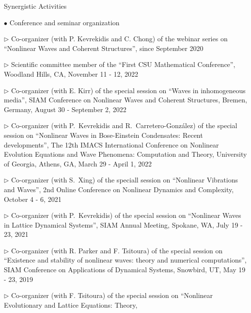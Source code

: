 \documentclass[10pt]{article} %
\newenvironment{outerlist}[1][\enskip\textbullet]%
        {\begin{itemize}[#1]}{\end{itemize}%
         \vspace{-.6\baselineskip}}
\newenvironment{innerlist}[1][\enskip\textbullet]%
        {\begin{compactitem}[#1]}{\end{compactitem}}
\begin{document}
\begin{section}{Synergistic Activities}
\begin{outerlist}
\item[$\bullet$]  \vskip -7mm Conference and seminar organization 
\begin{innerlist} 
\item[$\triangleright$] Co-organizer (with P. Kevrekidis and C. Chong) of the webinar series on 
                        ``Nonlinear Waves and Coherent Structures'', since September 2020
\item[$\triangleright$] Scientific committee member of the ``First CSU Mathematical Conference'', Woodland Hills, CA, November 11 - 12, 2022
\item[$\triangleright$] Co-organizer (with E. Kirr) of the special session on ``Waves in inhomogeneous media'', 
                        SIAM Conference on Nonlinear Waves and Coherent Structures, Bremen, Germany, August 30 - September 2, 2022                        
\item[$\triangleright$] Co-organizer (with P.~Kevrekidis and R.~Carretero-Gonz{\'a}lez) of 
                        the special session on ``Nonlinear Waves in Bose-Einstein Condensates: Recent developments'', 
                        The 12th IMACS International Conference on Nonlinear Evolution Equations and Wave Phenomena: 
                        Computation and Theory, University of Georgia, Athens, GA, March 29 - April 1, 2022                       
\item[$\triangleright$] Co-organizer (with S.~Xing) of the speciall session on ``Nonlinear Vibrations and Waves'', %
                        2nd Online Conference on Nonlinear Dynamics and Complexity, October 4 - 6, 2021
\item[$\triangleright$] Co-organizer (with P.~Kevrekidis) of the special session on 
                         ``Nonlinear Waves in Lattice Dynamical Systems'',
                         SIAM Annual Meeting, Spokane, WA, July 19 - 23, 2021
\item[$\triangleright$] Co-organizer (with R. Parker and F. Tsitoura) of the special session on 
                        ``Existence and stability of nonlinear waves: theory and numerical computations'', 
                        SIAM Conference on Applications of Dynamical Systems, Snowbird, UT, May 19 - 23, 2019 
\item[$\triangleright$] Co-organizer (with F. Tsitoura) of the special session on ``Nonlinear Evolutionary and Lattice Equations: Theory, 

\end{innerlist}
\end{outerlist}
\end{section}
\end{document}
